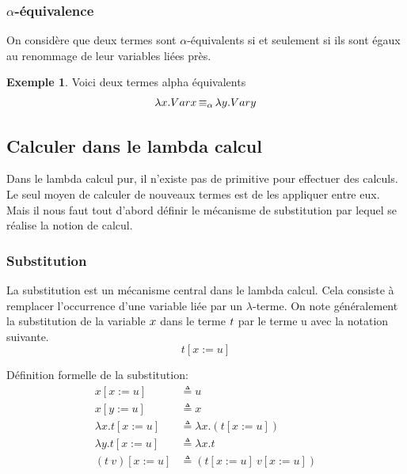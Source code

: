 \documentclass {article}
\theoremstyle{definition}
\newtheorem{example}{Exemple}
\theoremstyle{remark}
\begin{document}
\subsubsection{$\alpha$-équivalence}
\label{alpha_equiv}

\newcommand{\equivAlpha}{\mathop{\equiv_\alpha}}

On considère que deux termes sont \(\alpha\)-équivalents si et seulement si ils sont 
égaux au renommage de leur variables liées près. 
\begin{example}
  Voici deux termes alpha équivalents 
  \begin{align*}
    & \Lam{x}{Var{x}} \equivAlpha \Lam{y}{Var{y}} \\
  \end{align*}
\end{example}
  
\subsection{Calculer dans le lambda calcul}
\label{calculer_dans_le_lambda_calcul}

Dans le lambda calcul pur, il n'existe pas de primitive pour effectuer des 
calculs. Le seul moyen de calculer de nouveaux termes est de les appliquer 
entre eux. Mais il nous faut tout d'abord définir le mécanisme de substitution par lequel se réalise la notion de calcul.

\subsubsection{Substitution}

\newcommand{\subst}[3]{#1[#2 := #3]}


La substitution est un mécanisme central dans le lambda calcul. Cela consiste 
à remplacer l'occurrence d'une variable liée par un \(\lambda\)-terme.
On note généralement la substitution de la variable $x$ dans le terme $t$ par le 
terme u avec la notation suivante. 
\[ 
\subst{t}{x}{u}
\]

Définition formelle de la substitution: 
\begin{align*}
    \subst{x}{x}{u} &\triangleq u \\
    \subst{x}{y}{u} &\triangleq x \\
    \subst{\lambda x.t}{x}{u} &\triangleq \lambda x.(\subst{t}{x}{u}) \\
    \subst{\lambda y.t}{x}{u} &\triangleq \lambda x.t \\
    \subst{(t\: v)}{x}{u} &\triangleq (\subst{t}{x}{u}\: \subst{v}{x}{u}) 
\end{align*}
\end{document}
